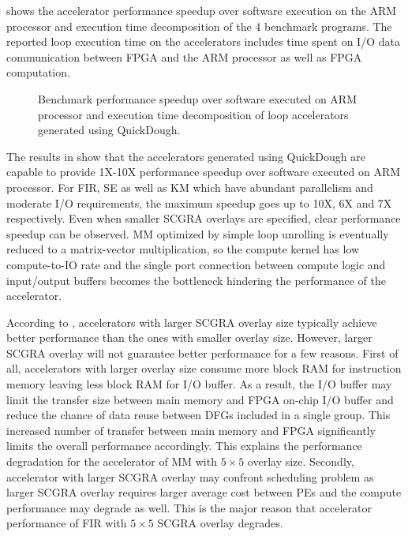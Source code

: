  shows the accelerator performance speedup over software execution on the ARM processor 
and execution time decomposition of the 4 benchmark programs. The reported loop execution
time on the accelerators includes time spent on I/O data communication between FPGA and the 
ARM processor as well as FPGA computation.

\begin{figure}
\centering
{}
\qquad
{}
\qquad
{}
\qquad
{}
\caption{Benchmark performance speedup over software executed on ARM processor and execution time 
    decomposition of loop accelerators generated using QuickDough.}
\label{fig:real-perf}
\end{figure}

The results in  show that the accelerators generated using QuickDough are 
capable to provide 1X-10X performance speedup over software executed on ARM processor. For FIR, SE 
as well as KM which have abundant parallelism and moderate I/O requirements, the maximum speedup
goes up to 10X, 6X and 7X respectively. Even when smaller SCGRA overlays are specified, clear
performance speedup can be observed. MM optimized by simple loop unrolling is eventually reduced to
a matrix-vector multiplication, so the compute kernel has low compute-to-IO rate and the single port
connection between compute logic and input/output buffers becomes the bottleneck hindering
the performance of the accelerator.  

According to , accelerators with larger SCGRA overlay size typically achieve
better performance than the ones with smaller overlay size. However, larger SCGRA overlay will not
guarantee better performance for a few reasons. First of all, accelerators with larger overlay size consume
more block RAM for instruction memory leaving less block RAM for I/O buffer. As a result, the I/O
buffer may limit the transfer size between main memory and FPGA on-chip I/O buffer and reduce the
chance of data reuse between DFGs included in a single group. This increased number of transfer
between main memory and FPGA significantly limits the overall performance accordingly. This explains
the performance degradation for the accelerator of MM with $5 \times 5$ overlay size. Secondly, 
accelerator with larger SCGRA overlay may confront scheduling problem as larger SCGRA
overlay requires larger average cost between PEs and the compute performance may degrade as well.
This is the major reason that accelerator performance of FIR with $5 \times 5$ SCGRA overlay degrades.

